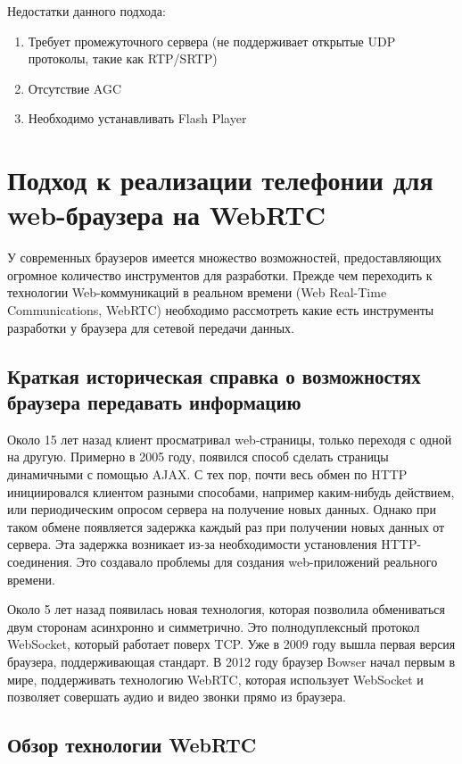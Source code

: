 Недостатки данного подхода:
\begin{enumerate}
\item Требует промежуточного сервера (не поддерживает открытые UDP протоколы, такие как RTP/SRTP)
\item Отсутствие AGC
\item Необходимо устанавливать Flash Player
\end{enumerate}

\section{Подход к реализации телефонии для web-браузера на WebRTC}

У современных браузеров имеется множество возможностей, предоставляющих огромное количество инструментов для разработки. Прежде чем переходить к технологии Web-коммуникаций в реальном времени (Web Real-Time Communications, WebRTC) необходимо рассмотреть какие есть инструменты разработки у браузера для сетевой передачи данных.

\subsection{Краткая историческая справка о возможностях браузера передавать информацию}

Около 15 лет назад клиент просматривал web-страницы, только переходя с одной на другую. Примерно в 2005 году, появился способ сделать страницы динамичными с помощью AJAX. С тех пор, почти весь обмен по HTTP инициировался клиентом разными способами, например каким-нибудь действием, или периодическим опросом сервера на получение новых данных. Однако при таком обмене появляется задержка каждый раз при получении новых данных от сервера. Эта задержка возникает из-за необходимости установления HTTP-соединения. Это создавало проблемы для создания web-приложений реального времени.\cite{ajax_problem}

Около 5 лет назад появилась новая технология, которая позволила обмениваться двум сторонам асинхронно и симметрично. Это полнодуплексный протокол WebSocket, который работает поверх TCP. Уже в 2009 году вышла первая версия браузера, поддерживающая стандарт.\cite{web_socket_begining} В 2012 году браузер Bowser начал первым в мире, поддерживать технологию WebRTC, которая использует WebSocket и позволяет совершать аудио и видео звонки прямо из браузера.\cite{bowser}

\subsection{Обзор технологии WebRTC}

